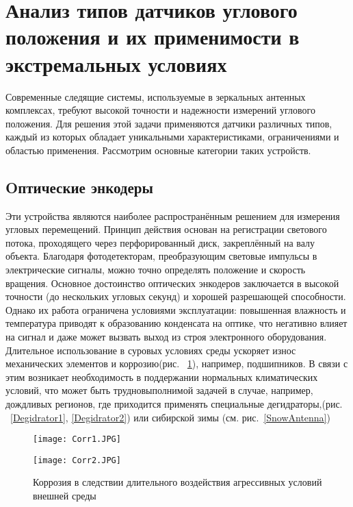 \section{Анализ типов датчиков углового положения и их применимости в экстремальных условиях}

Современные следящие системы, используемые в зеркальных антенных комплексах, требуют высокой точности и надежности измерений углового положения. 
Для решения этой задачи применяются датчики различных типов, каждый из которых обладает уникальными характеристиками, ограничениями и областью применения. 
Рассмотрим основные категории таких устройств.

\subsection{Oптические энкодеры} 
  
  Эти устройства являются наиболее распространённым решением для измерения угловых перемещений. Принцип действия основан на регистрации светового потока, проходящего через перфорированный диск, 
  закреплённый на валу объекта. Благодаря фотодетекторам, преобразующим световые импульсы в электрические сигналы, можно точно определять положение и скорость вращения.
  Основное достоинство оптических энкодеров заключается в высокой точности (до нескольких угловых секунд) и хорошей разрешающей способности. 
  Однако их работа ограничена условиями эксплуатации: повышенная влажность и температура приводят к образованию конденсата на оптике, 
  что негативно влияет на сигнал и даже может вызвать выход из строя электронного оборудования. 
  Длительное использование в суровых условиях среды ускоряет износ механических элементов и коррозию(рис. ~\ref{Corr}), например, подшипников. В связи с этим возникает необходимость в поддержании нормальных климатических условий,
  что может быть трудновыполнимой задачей в случае, например, дождливых регионов, где приходится применять специальные дегидраторы,(рис. ~\ref{Degidrator1}, \ref{Degidrator2}) 
  или сибирской зимы (см. рис.~\ref{SnowAntenna})

\begin{figure}[htbp]
    \centering
    \begin{minipage}{0.48\linewidth}
       \texttt{[image: Сorr1.JPG]} 
        
    \end{minipage}\hfill
    \begin{minipage}{0.48\linewidth}
       \centering
        \texttt{[image: Corr2.JPG]} 
     
    \end{minipage}

    \caption{Коррозия в следствии длительного воздействия агрессивных условий внешней среды}
    \label{Corr}
\end{figure}

